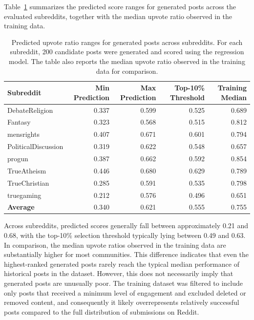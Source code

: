 Table~\ref{tab:generated_prediction_ranges} summarizes the predicted score ranges for generated posts across the evaluated subreddits, together with the median upvote ratio observed in the training data.

\begin{table}[htbp]
\centering
\caption{Predicted upvote ratio ranges for generated posts across subreddits. For each subreddit, 200 candidate posts were generated and scored using the regression model. The table also reports the median upvote ratio observed in the training data for comparison.}
\label{tab:generated_prediction_ranges}
\begin{tabular}{lrrrr}
\toprule
Subreddit & Min Prediction & Max Prediction & Top-10\% Threshold & Training Median \\
\midrule
DebateReligion       & 0.337 & 0.599 & 0.525 & 0.689 \\
Fantasy              & 0.323 & 0.568 & 0.515 & 0.812 \\
mensrights           & 0.407 & 0.671 & 0.601 & 0.794 \\
PoliticalDiscussion  & 0.319 & 0.622 & 0.548 & 0.657 \\
progun               & 0.387 & 0.662 & 0.592 & 0.854 \\
TrueAtheism          & 0.446 & 0.680 & 0.629 & 0.789 \\
TrueChristian        & 0.285 & 0.591 & 0.535 & 0.798 \\
truegaming           & 0.212 & 0.576 & 0.496 & 0.651 \\
\midrule
\textbf{Average}     & 0.340 & 0.621 & 0.555 & 0.755 \\
\bottomrule
\end{tabular}
\end{table}

Across subreddits, predicted scores generally fall between approximately 0.21 and 0.68, with the top-10\% selection threshold typically lying between 0.49 and 0.63. In comparison, the median upvote ratios observed in the training data are substantially higher for most communities. This difference indicates that even the highest-ranked generated posts rarely reach the typical median performance of historical posts in the dataset. However, this does not necessarily imply that generated posts are unusually poor. The training dataset was filtered to include only posts that received a minimum level of engagement and excluded deleted or removed content, and consequently it likely overrepresents relatively successful posts compared to the full distribution of submissions on Reddit.

